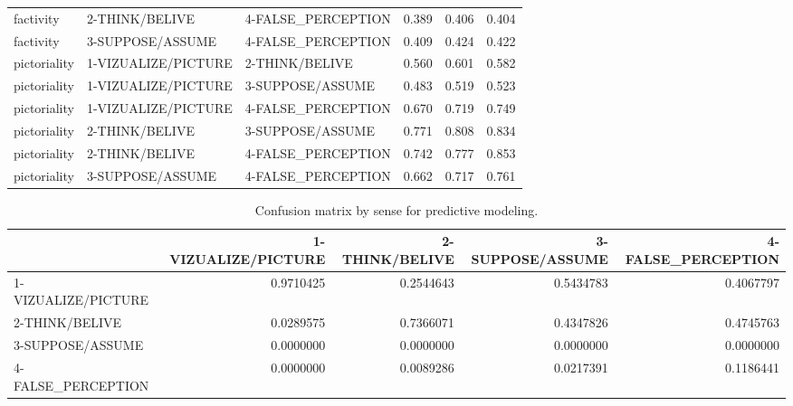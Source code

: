 \documentclass[
]{article}
\begin{document}
\begin{landscape}
\begin{table}[H]
\begin{tabular}[t]{lllrrr}
factivity & 2-THINK/BELIVE & 4-FALSE\_PERCEPTION & 0.389 & 0.406 & 0.404\\
factivity & 3-SUPPOSE/ASSUME & 4-FALSE\_PERCEPTION & 0.409 & 0.424 & 0.422\\
pictoriality & 1-VIZUALIZE/PICTURE & 2-THINK/BELIVE & 0.560 & 0.601 & 0.582\\
pictoriality & 1-VIZUALIZE/PICTURE & 3-SUPPOSE/ASSUME & 0.483 & 0.519 & 0.523\\
pictoriality & 1-VIZUALIZE/PICTURE & 4-FALSE\_PERCEPTION & 0.670 & 0.719 & 0.749\\
pictoriality & 2-THINK/BELIVE & 3-SUPPOSE/ASSUME & 0.771 & 0.808 & 0.834\\
pictoriality & 2-THINK/BELIVE & 4-FALSE\_PERCEPTION & 0.742 & 0.777 & 0.853\\
pictoriality & 3-SUPPOSE/ASSUME & 4-FALSE\_PERCEPTION & 0.662 & 0.717 & 0.761\\
\bottomrule
\end{tabular}
\end{table}
\end{landscape}

\begin{landscape}\begin{table}[H]
\centering
\caption{\label{tab:unnamed-chunk-32}Confusion matrix by sense for predictive modeling.\label{tab:cm}}
\centering
\fontsize{8}{10}\selectfont
\begin{tabular}[t]{lrrrr}
\toprule
  & 1-VIZUALIZE/PICTURE & 2-THINK/BELIVE & 3-SUPPOSE/ASSUME & 4-FALSE\_PERCEPTION\\
\midrule
1-VIZUALIZE/PICTURE & 0.9710425 & 0.2544643 & 0.5434783 & 0.4067797\\
2-THINK/BELIVE & 0.0289575 & 0.7366071 & 0.4347826 & 0.4745763\\
3-SUPPOSE/ASSUME & 0.0000000 & 0.0000000 & 0.0000000 & 0.0000000\\
4-FALSE\_PERCEPTION & 0.0000000 & 0.0089286 & 0.0217391 & 0.1186441\\
\bottomrule
\end{tabular}
\end{table}
\end{landscape}

  
\end{document}
